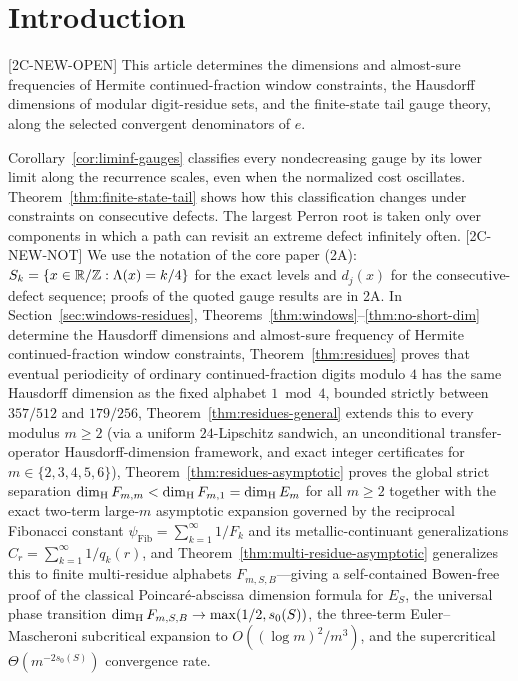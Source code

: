 
\section{Introduction}

[2C-NEW-OPEN] This article determines the dimensions and almost-sure
frequencies of Hermite continued-fraction window constraints, the Hausdorff
dimensions of modular digit-residue sets, and the finite-state tail gauge
theory, along the selected convergent denominators of $e$.

Corollary~\ref{cor:liminf-gauges} classifies every nondecreasing gauge by
its lower limit along the recurrence scales, even when the normalized
cost oscillates. Theorem~\ref{thm:finite-state-tail} shows how this
classification changes under constraints on consecutive defects.
The largest Perron root is taken only over components in which a path
can revisit an extreme defect infinitely often.
[2C-NEW-NOT] We use the notation of the core paper (2A):
$S_k=\{x\in\mathbb{R}/\mathbb{Z}:\Lambda(x)=k/4\}$ for the exact levels and $d_j(x)$
for the consecutive-defect sequence; proofs of the quoted gauge results
are in 2A.
In Section~\ref{sec:windows-residues}, Theorems~\ref{thm:windows}--\ref{thm:no-short-dim}
determine the Hausdorff dimensions and almost-sure frequency of Hermite
continued-fraction window constraints, Theorem~\ref{thm:residues} proves
that eventual periodicity of ordinary continued-fraction digits modulo $4$ has
the same Hausdorff dimension as the fixed alphabet $1\bmod 4$, bounded strictly
between $357/512$ and $179/256$, Theorem~\ref{thm:residues-general} extends this
to every modulus $m\ge2$ (via a uniform $24$-Lipschitz sandwich, an unconditional
transfer-operator Hausdorff-dimension framework, and exact integer certificates
for $m\in\{2,3,4,5,6\}$), Theorem~\ref{thm:residues-asymptotic} proves the
global strict separation $\dim_{\mathrm{H}} F_{m,m}<\dim_{\mathrm{H}} F_{m,1}=\dim_{\mathrm{H}} E_m$ for all $m\ge2$
together with the exact two-term large-$m$ asymptotic expansion governed by the
reciprocal Fibonacci constant $\psi_{\mathrm{Fib}}=\sum_{k=1}^\infty 1/F_k$ and
its metallic-continuant generalizations $C_r=\sum_{k=1}^\infty 1/q_k(r)$, and
Theorem~\ref{thm:multi-residue-asymptotic} generalizes this to finite
multi-residue alphabets $F_{m,S,B}$---giving a self-contained Bowen-free proof
of the classical Poincar\'e-abscissa dimension formula for $E_S$, the universal phase transition
$\dim_{\mathrm{H}} F_{m,S,B}\to\max(1/2,s_0(S))$, the three-term Euler--Mascheroni
subcritical expansion to $O((\log m)^2/m^3)$, and the supercritical
$\Theta(m^{-2s_0(S)})$ convergence rate.

